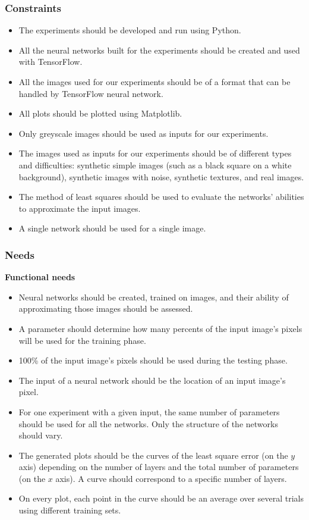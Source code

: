 \documentclass[a4paper]{article}
\begin{document}
\subsubsection{Constraints}
\begin{itemize}
\item The experiments should be developed and run using Python.
\item All the neural networks built for the experiments should be created and used with TensorFlow.
\item All the images used for our experiments should be of a format that can be handled by TensorFlow neural network. 
\item All plots should be plotted using Matplotlib.
\item Only greyscale images should be used as inputs for our experiments.
\item The images used as inputs for our experiments should be of different types and difficulties: synthetic simple images (such as a black square on a white background), synthetic images with noise, synthetic textures, and real images.
\item The method of least squares should be used to evaluate the networks' abilities to approximate the input images.
\item A single network should be used for a single image.
\end{itemize}

\subsubsection{Needs}
\noindent\textbf{Functional needs}
\begin{itemize}
\item Neural networks should be created, trained on images, and their ability of approximating those images should be assessed. 
\item A parameter should determine how many percents of the input image's pixels will be used for the training phase.
\item 100\% of the input image's pixels should be used during the testing phase.
\item The input of a neural network should be the location of an input image's pixel.
\item For one experiment with a given input, the same number of parameters should be used for all the networks. Only the structure of the networks should vary.
\item The generated plots should be the curves of the least square error (on the $y$ axis) depending on the number of layers and the total number of parameters (on the $x$ axis). A curve should correspond to a specific number of layers.
\item On every plot, each point in the curve should be an average over several trials using different training sets.

\end{itemize}
\end{document}
